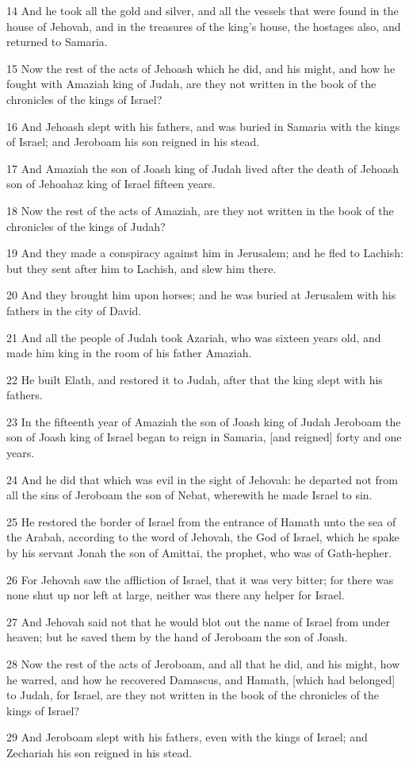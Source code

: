 \par 14 And he took all the gold and silver, and all the vessels that were found in the house of Jehovah, and in the treasures of the king's house, the hostages also, and returned to Samaria.
\par 15 Now the rest of the acts of Jehoash which he did, and his might, and how he fought with Amaziah king of Judah, are they not written in the book of the chronicles of the kings of Israel?
\par 16 And Jehoash slept with his fathers, and was buried in Samaria with the kings of Israel; and Jeroboam his son reigned in his stead.
\par 17 And Amaziah the son of Joash king of Judah lived after the death of Jehoash son of Jehoahaz king of Israel fifteen years.
\par 18 Now the rest of the acts of Amaziah, are they not written in the book of the chronicles of the kings of Judah?
\par 19 And they made a conspiracy against him in Jerusalem; and he fled to Lachish: but they sent after him to Lachish, and slew him there.
\par 20 And they brought him upon horses; and he was buried at Jerusalem with his fathers in the city of David.
\par 21 And all the people of Judah took Azariah, who was sixteen years old, and made him king in the room of his father Amaziah.
\par 22 He built Elath, and restored it to Judah, after that the king slept with his fathers.
\par 23 In the fifteenth year of Amaziah the son of Joash king of Judah Jeroboam the son of Joash king of Israel began to reign in Samaria, [and reigned] forty and one years.
\par 24 And he did that which was evil in the sight of Jehovah: he departed not from all the sins of Jeroboam the son of Nebat, wherewith he made Israel to sin.
\par 25 He restored the border of Israel from the entrance of Hamath unto the sea of the Arabah, according to the word of Jehovah, the God of Israel, which he spake by his servant Jonah the son of Amittai, the prophet, who was of Gath-hepher.
\par 26 For Jehovah saw the affliction of Israel, that it was very bitter; for there was none shut up nor left at large, neither was there any helper for Israel.
\par 27 And Jehovah said not that he would blot out the name of Israel from under heaven; but he saved them by the hand of Jeroboam the son of Joash.
\par 28 Now the rest of the acts of Jeroboam, and all that he did, and his might, how he warred, and how he recovered Damascus, and Hamath, [which had belonged] to Judah, for Israel, are they not written in the book of the chronicles of the kings of Israel?
\par 29 And Jeroboam slept with his fathers, even with the kings of Israel; and Zechariah his son reigned in his stead.

